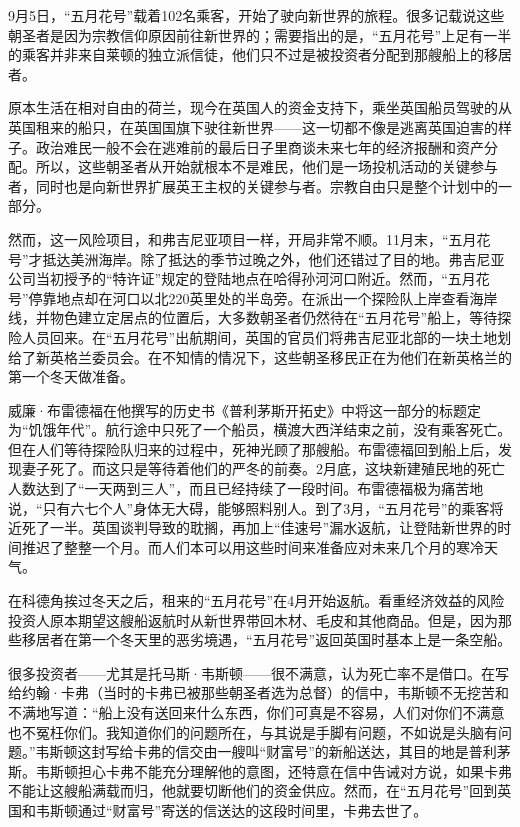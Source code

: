 \documentclass[12pt,oneside]{book}
\begin{document}
\begin{bookref}[frametitle={\cite{美国四百年}}]
9月5日，“五月花号”载着102名乘客，开始了驶向新世界的旅程。很多记载说这些朝圣者是因为宗教信仰原因前往新世界的；需要指出的是，“五月花号”上足有一半的乘客并非来自莱顿的独立派信徒，他们只不过是被投资者分配到那艘船上的移居者。

原本生活在相对自由的荷兰，现今在英国人的资金支持下，乘坐英国船员驾驶的从英国租来的船只，在英国国旗下驶往新世界——这一切都不像是逃离英国迫害的样子。政治难民一般不会在逃难前的最后日子里商谈未来七年的经济报酬和资产分配。所以，这些朝圣者从开始就根本不是难民，他们是一场投机活动的关键参与者，同时也是向新世界扩展英王主权的关键参与者。宗教自由只是整个计划中的一部分。

然而，这一风险项目，和弗吉尼亚项目一样，开局非常不顺。11月末，“五月花号”才抵达美洲海岸。除了抵达的季节过晚之外，他们还错过了目的地。弗吉尼亚公司当初授予的“特许证”规定的登陆地点在哈得孙河河口附近。然而，“五月花号”停靠地点却在河口以北220英里处的半岛旁。在派出一个探险队上岸查看海岸线，并物色建立定居点的位置后，大多数朝圣者仍然待在“五月花号”船上，等待探险人员回来。在“五月花号”出航期间，英国的官员们将弗吉尼亚北部的一块土地划给了新英格兰委员会。在不知情的情况下，这些朝圣移民正在为他们在新英格兰的第一个冬天做准备。

威廉·布雷德福在他撰写的历史书《普利茅斯开拓史》中将这一部分的标题定为“饥饿年代”。航行途中只死了一个船员，横渡大西洋结束之前，没有乘客死亡。但在人们等待探险队归来的过程中，死神光顾了那艘船。布雷德福回到船上后，发现妻子死了。而这只是等待着他们的严冬的前奏。2月底，这块新建殖民地的死亡人数达到了“一天两到三人”，而且已经持续了一段时间。布雷德福极为痛苦地说，“只有六七个人”身体无大碍，能够照料别人。到了3月，“五月花号”的乘客将近死了一半。英国谈判导致的耽搁，再加上“佳速号”漏水返航，让登陆新世界的时间推迟了整整一个月。而人们本可以用这些时间来准备应对未来几个月的寒冷天气。

在科德角挨过冬天之后，租来的“五月花号”在4月开始返航。看重经济效益的风险投资人原本期望这艘船返航时从新世界带回木材、毛皮和其他商品。但是，因为那些移居者在第一个冬天里的恶劣境遇，“五月花号”返回英国时基本上是一条空船。

很多投资者——尤其是托马斯·韦斯顿——很不满意，认为死亡率不是借口。在写给约翰·卡弗（当时的卡弗已被那些朝圣者选为总督）的信中，韦斯顿不无挖苦和不满地写道：“船上没有送回来什么东西，你们可真是不容易，人们对你们不满意也不冤枉你们。我知道你们的问题所在，与其说是手脚有问题，不如说是头脑有问题。”韦斯顿这封写给卡弗的信交由一艘叫“财富号”的新船送达，其目的地是普利茅斯。韦斯顿担心卡弗不能充分理解他的意图，还特意在信中告诫对方说，如果卡弗不能让这艘船满载而归，他就要切断他们的资金供应。然而，在“五月花号”回到英国和韦斯顿通过“财富号”寄送的信送达的这段时间里，卡弗去世了。


\end{bookref}
\end{document}
